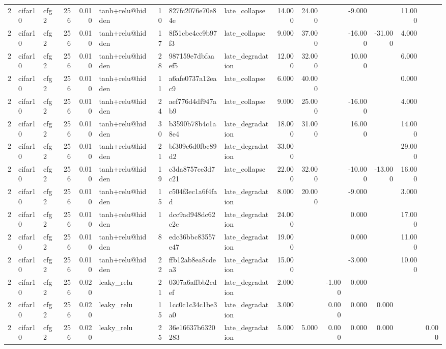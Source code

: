 \begin{table}[htbp]
{\begin{tabular}{@{}rllrrlrllrrrrrrr@{}}
2 & cifar10 & cfg2 & 256 & 0.010 & tanh+relu@hidden & 10 & 827fc2076e70e84e & late\_collapse & 14.000 & 24.000 &  & -9.000 &  & 11.000 &  \\
2 & cifar10 & cfg2 & 256 & 0.010 & tanh+relu@hidden & 17 & 8f51cbe4cc9b97f3 & late\_collapse & 9.000 & 37.000 &  & -16.000 & -31.000 & 4.000 &  \\
2 & cifar10 & cfg2 & 256 & 0.010 & tanh+relu@hidden & 28 & 987159e7dbfaaef5 & late\_degradation & 12.000 & 32.000 &  & 10.000 &  & 6.000 &  \\
2 & cifar10 & cfg2 & 256 & 0.010 & tanh+relu@hidden & 11 & a6afe0737a12eac9 & late\_collapse & 6.000 & 40.000 &  &  &  & 0.000 &  \\
2 & cifar10 & cfg2 & 256 & 0.010 & tanh+relu@hidden & 24 & aef776d4df947ab9 & late\_collapse & 9.000 & 25.000 &  & -16.000 &  & 4.000 &  \\
2 & cifar10 & cfg2 & 256 & 0.010 & tanh+relu@hidden & 30 & b3590b78b4c1a8e4 & late\_degradation & 18.000 & 31.000 &  & 16.000 &  & 14.000 &  \\
2 & cifar10 & cfg2 & 256 & 0.010 & tanh+relu@hidden & 21 & bf309c6d0fbc89d2 & late\_degradation & 33.000 &  &  &  &  & 29.000 &  \\
2 & cifar10 & cfg2 & 256 & 0.010 & tanh+relu@hidden & 19 & c3da8757ce3d7c21 & late\_collapse & 22.000 & 32.000 &  & -10.000 & -13.000 & 16.000 &  \\
2 & cifar10 & cfg2 & 256 & 0.010 & tanh+relu@hidden & 15 & c504f3ec1a6f4fad & late\_degradation & 8.000 & 20.000 &  & -9.000 &  & 3.000 &  \\
2 & cifar10 & cfg2 & 256 & 0.010 & tanh+relu@hidden & 1 & dcc9ad948dc62c2c & late\_degradation & 24.000 &  &  & 0.000 &  & 17.000 &  \\
2 & cifar10 & cfg2 & 256 & 0.010 & tanh+relu@hidden & 8 & edc36bbc83557e47 & late\_degradation & 19.000 &  &  & 0.000 &  & 11.000 &  \\
2 & cifar10 & cfg2 & 256 & 0.010 & tanh+relu@hidden & 22 & ffb12ab8ea8cdea3 & late\_degradation & 15.000 &  &  & -3.000 &  & 10.000 &  \\
2 & cifar10 & cfg2 & 256 & 0.020 & leaky\_relu & 21 & 0307a6affbb2cdef & late\_degradation & 2.000 &  & -1.000 & 0.000 &  &  &  \\
2 & cifar10 & cfg2 & 256 & 0.020 & leaky\_relu & 15 & 1cc0c1c34c1be3a0 & late\_degradation & 3.000 &  & 0.000 & 0.000 & 0.000 &  &  \\
2 & cifar10 & cfg2 & 256 & 0.020 & leaky\_relu & 25 & 36e16637b6320283 & late\_degradation & 5.000 & 5.000 & 0.000 & 0.000 & 0.000 &  & 0.000 \\

\end{tabular}}
\end{table}
